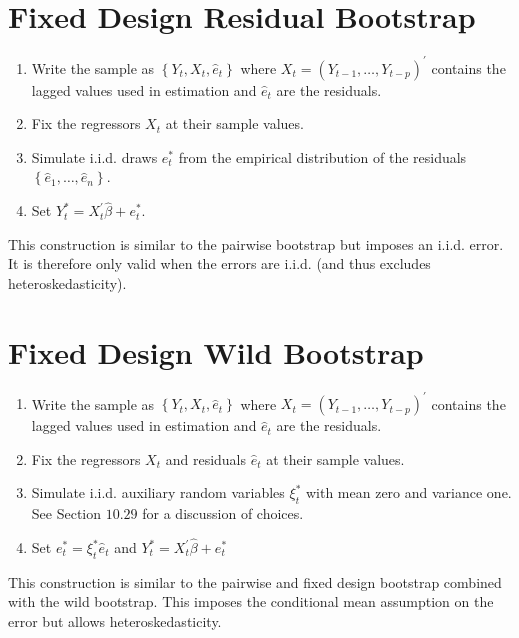 \documentclass[10pt]{article}
\begin{document}
\section{Fixed Design Residual Bootstrap}
\begin{enumerate}
  \item Write the sample as $\left\{Y_{t}, X_{t}, \widehat{e}_{t}\right\}$ where $X_{t}=\left(Y_{t-1}, \ldots, Y_{t-p}\right)^{\prime}$ contains the lagged values used in estimation and $\widehat{e}_{t}$ are the residuals.

  \item Fix the regressors $X_{t}$ at their sample values.

  \item Simulate i.i.d. draws $e_{t}^{*}$ from the empirical distribution of the residuals $\left\{\widehat{e}_{1}, \ldots, \widehat{e}_{n}\right\}$.

  \item Set $Y_{t}^{*}=X_{t}^{\prime} \widehat{\beta}+e_{t}^{*}$.

\end{enumerate}
This construction is similar to the pairwise bootstrap but imposes an i.i.d. error. It is therefore only valid when the errors are i.i.d. (and thus excludes heteroskedasticity).

\section{Fixed Design Wild Bootstrap}
\begin{enumerate}
  \item Write the sample as $\left\{Y_{t}, X_{t}, \widehat{e}_{t}\right\}$ where $X_{t}=\left(Y_{t-1}, \ldots, Y_{t-p}\right)^{\prime}$ contains the lagged values used in estimation and $\widehat{e}_{t}$ are the residuals.

  \item Fix the regressors $X_{t}$ and residuals $\widehat{e}_{t}$ at their sample values.

  \item Simulate i.i.d. auxiliary random variables $\xi_{t}^{*}$ with mean zero and variance one. See Section $10.29$ for a discussion of choices.

  \item Set $e_{t}^{*}=\xi_{t}^{*} \widehat{e}_{t}$ and $Y_{t}^{*}=X_{t}^{\prime} \widehat{\beta}+e_{t}^{*}$

\end{enumerate}
This construction is similar to the pairwise and fixed design bootstrap combined with the wild bootstrap. This imposes the conditional mean assumption on the error but allows heteroskedasticity.
\end{document}
